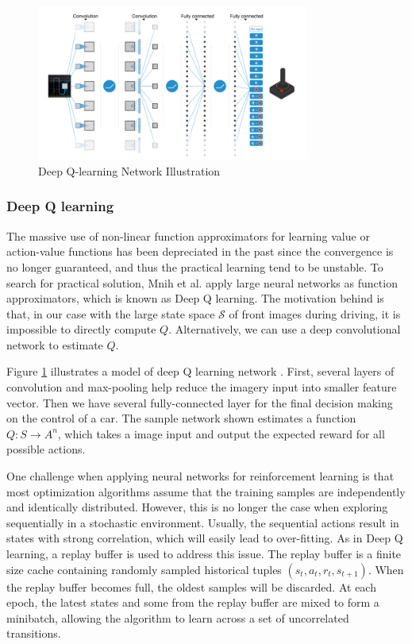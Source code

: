 \documentclass[a4paper]{article}
\begin{document}
\begin{figure}
	\centering
	\includegraphics[width=0.8\textwidth]{./figures/deepq.png}
    \caption{ Deep Q-learning Network Illustration \cite{dqn}}
	\label{fig:deepq}
\end{figure}

\subsubsection{Deep Q learning}
The massive use of non-linear function approximators for learning value or action-value functions has
been depreciated in the past since the convergence is no longer guaranteed, and thus the practical
learning tend to be unstable. To search for practical solution, Mnih et al. \cite{dql} apply large
neural networks as function approximators, which is known as Deep Q learning. The motivation
behind is that, in our case with the large state space $\mathcal{S}$ of front images during driving,
it is impossible to directly compute $Q$. Alternatively,
we can use a deep convolutional network to estimate $Q$.

Figure \ref{fig:deepq} illustrates a model of deep Q learning network \cite{dqn}. First, 
several layers of convolution and max-pooling help reduce the imagery input into smaller feature
vector.
Then we have several fully-connected layer for the final decision making on the control of a car.
The sample network
shown estimates a function $Q : S \rightarrow A^n$, which takes a image input and output the
expected reward for all possible actions.

One challenge when applying neural networks for reinforcement learning is that most optimization
algorithms assume that the training samples are independently and identically distributed. However,
this is no longer the case when exploring sequentially in a stochastic environment. Usually, the
sequential actions result in states with strong correlation, which will easily lead to over-fitting.
As in Deep Q learning, a replay buffer is used to address this issue. The replay buffer is a finite
size cache containing randomly sampled historical tuples $(s_t, a_t, r_t, s_{t+1})$. When the replay
buffer becomes full, the oldest samples will be discarded. At each epoch, the latest states and some
from the replay buffer are mixed to form a minibatch, allowing the algorithm to learn across a set of
uncorrelated transitions.
\end{document}
